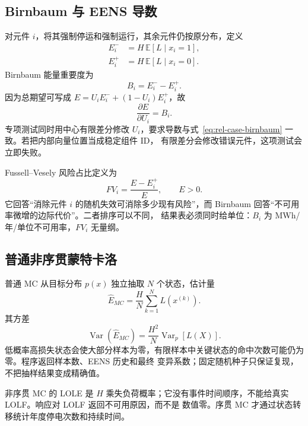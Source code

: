 \subsection{Birnbaum 与 EENS 导数}
对元件 $i$，将其强制停运和强制运行，其余元件仍按原分布，定义
\begin{align}
 E_i^-&=H\,\mathbb E[L\mid x_i=1],\\
 E_i^+&=H\,\mathbb E[L\mid x_i=0].
\end{align}
Birnbaum 能量重要度为
\begin{equation}\label{eq:rel-case-birnbaum}
 B_i=E_i^--E_i^+.
\end{equation}
因为总期望可写成 $E=U_iE_i^-+(1-U_i)E_i^+$，故
\begin{equation}
 \frac{\partial E}{\partial U_i}=B_i.
\end{equation}
专项测试同时用中心有限差分修改 $U_i$，要求导数与式~\eqref{eq:rel-case-birnbaum} 一致。若把内部向量位置当成稳定组件 ID，
有限差分会修改错误元件，这项测试会立即失败。

Fussell--Vesely 风险占比定义为
\begin{equation}
 FV_i=\frac{E-E_i^+}{E},\qquad E>0.
\end{equation}
它回答“消除元件 $i$ 的随机失效可消除多少现有风险”，而 Birnbaum 回答“不可用率微增的边际代价”。二者排序可以不同，
结果表必须同时给单位：$B_i$ 为 MWh/年/单位不可用率，$FV_i$ 无量纲。

\subsection{普通非序贯蒙特卡洛}
普通 MC 从目标分布 $p(x)$ 独立抽取 $N$ 个状态，估计量
\begin{equation}
 \widehat E_{MC}=\frac{H}{N}\sum_{k=1}^NL(x^{(k)}).
\end{equation}
其方差
\begin{equation}
 \operatorname{Var}(\widehat E_{MC})=\frac{H^2}{N}
 \operatorname{Var}_p[L(X)].
\end{equation}
低概率高损失状态会使大部分样本为零，有限样本中关键状态的命中次数可能仍为零。程序返回样本数、EENS 历史和最终
变异系数；固定随机种子只保证复现，不把抽样结果变成精确值。

非序贯 MC 的 LOLE 是 $H$ 乘失负荷概率；它没有事件时间顺序，不能给真实 LOLF。响应对 LOLF 返回不可用原因，而不是
数值零。序贯 MC 才通过状态转移统计年度停电次数和持续时间。

